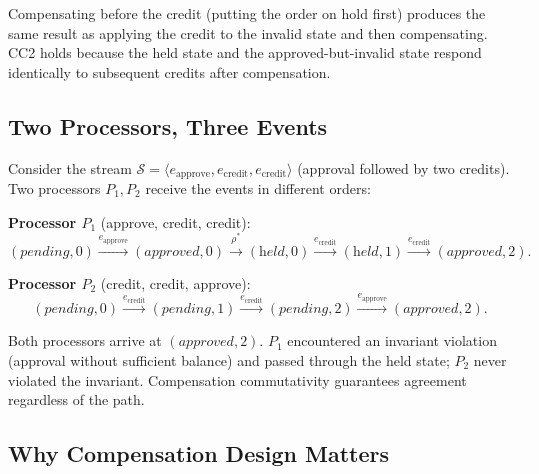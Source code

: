 \documentclass[11pt,a4paper]{article}
\theoremstyle{plain}
\theoremstyle{definition}
\theoremstyle{remark}
\renewcommand{\_}{\textunderscore\allowbreak}
\begin{document}
Compensating before the credit (putting the order on hold first) produces the
same result as applying the credit to the invalid state and then compensating.
CC2 holds because the held state and the approved-but-invalid state respond
identically to subsequent credits after compensation.

\subsection{Two Processors, Three Events}

Consider the stream $\mathcal{S} = \langle e_{\mathrm{approve}},
e_{\mathrm{credit}}, e_{\mathrm{credit}} \rangle$ (approval followed by two
credits).  Two processors $P_1, P_2$ receive the events in different orders:

\medskip\noindent
\textbf{Processor $P_1$} (approve, credit, credit):
\[
(\textit{pending}, 0)
\xrightarrow{e_{\mathrm{approve}}} (\textit{approved}, 0)
\xrightarrow{\rho^*} (\textit{held}, 0)
\xrightarrow{e_{\mathrm{credit}}} (\textit{held}, 1)
\xrightarrow{e_{\mathrm{credit}}} (\textit{approved}, 2).
\]

\noindent
\textbf{Processor $P_2$} (credit, credit, approve):
\[
(\textit{pending}, 0)
\xrightarrow{e_{\mathrm{credit}}} (\textit{pending}, 1)
\xrightarrow{e_{\mathrm{credit}}} (\textit{pending}, 2)
\xrightarrow{e_{\mathrm{approve}}} (\textit{approved}, 2).
\]

\noindent Both processors arrive at $(\textit{approved}, 2)$.  $P_1$ encountered
an invariant violation (approval without sufficient balance) and passed
through the held state; $P_2$ never violated the invariant.  Compensation
commutativity guarantees agreement regardless of the path.

\subsection{Why Compensation Design Matters}
\end{document}
